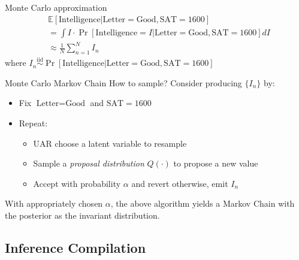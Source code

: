 \begin{frame}[fragile]{Monte Carlo approximation}
\begin{align*}
    &\mathbb{E}[\text{Intelligence} | \text{Letter}=\text{Good}, \text{SAT}=1600] \\
    &= \int I \cdot \Pr[\text{Intelligence}=I | \text{Letter}=\text{Good}, \text{SAT}=1600] dI \\
    &\approx \frac{1}{N} \sum_{n=1}^N I_n
\end{align*}
where $I_n \overset{\text{iid}}{\sim} \Pr[\text{Intelligence} | \text{Letter}=\text{Good}, \text{SAT}=1600]$

\end{frame}

\begin{frame}[fragile]{Monte Carlo Markov Chain}
    How to sample? Consider producing $\{I_n\}$ by:
    \begin{itemize}
        \item Fix $\text{Letter}=\text{Good}$ and $\text{SAT}=1600$
        \item Repeat:
        \begin{itemize}[<+->]
            \item UAR choose a latent variable to resample
            \item Sample a \emph{proposal distribution} $Q(\cdot)$ to propose a new value
            \item Accept with probability $\alpha$ and revert otherwise, emit $I_n$
        \end{itemize}
    \end{itemize}
    \pause
    \begin{theorem}
        With appropriately chosen $\alpha$, the above algorithm yields
        a Markov Chain with the posterior as the invariant distribution.
    \end{theorem}
\end{frame}

\subsection{Inference Compilation}

